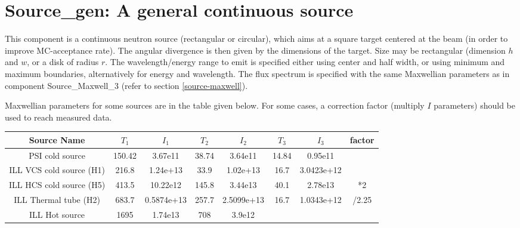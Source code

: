 \section{Source\_gen: A general continuous source}
\label{source-gen}


This component is a continuous neutron source (rectangular or circular), which aims at
a square target centered at the beam (in order to improve MC-acceptance
rate). The angular divergence is then given by the dimensions of the
target. Size may be rectangular (dimension $h$ and $w$, or a disk of radius $r$. The wavelength/energy range to emit is specified either using center and half width, or using minimum and maximum boundaries, alternatively for energy and wavelength.
The flux spectrum is specified with the same Maxwellian parameters as in component Source\_Maxwell\_3 (refer to section \ref{source-maxwell}).

Maxwellian parameters for some sources are in the table given below. For some cases, a correction factor (multiply $I$ parameters) should be used to reach measured data.

\begin{tabular}{cccccccc}
\hline
Source Name & $T_1$ & $I_1$ & $T_2$ & $I_2$ & $T_3$ & $I_3$ & factor \\
\hline
PSI cold source          & 150.42 & 3.67e11   & 38.74 & 3.64e11    & 14.84& 0.95e11    &\\
ILL VCS cold source (H1) & 216.8  & 1.24e+13  & 33.9  & 1.02e+13   & 16.7 & 3.0423e+12 &\\
ILL HCS cold source (H5) & 413.5  & 10.22e12  & 145.8 & 3.44e13    & 40.1 & 2.78e13    & *2\\
ILL Thermal tube (H2)    & 683.7  & 0.5874e+13& 257.7 & 2.5099e+13 & 16.7 & 1.0343e+12 & /2.25\\
ILL Hot source           & 1695   & 1.74e13   & 708   & 3.9e12     &      &            &\\
\end{tabular}